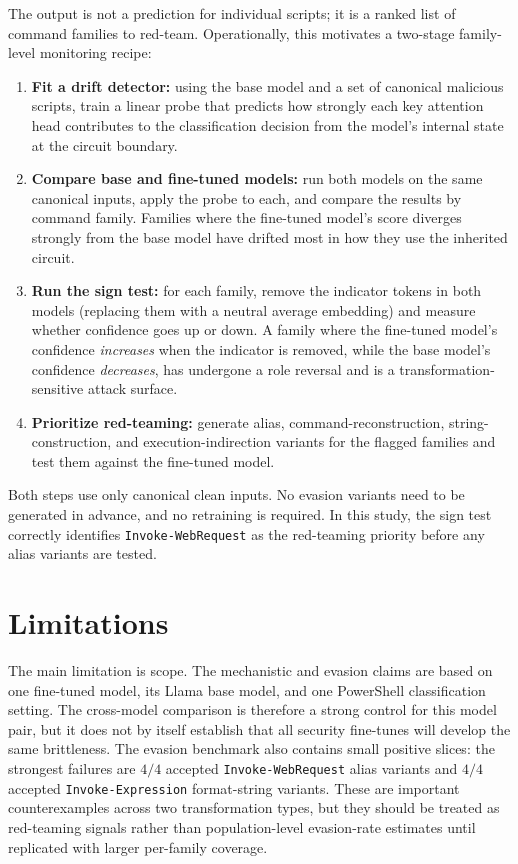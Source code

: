 \documentclass{article}
\begin{document}
The output is not a prediction for individual scripts; it is a ranked list of command families to red-team. Operationally, this motivates a two-stage family-level monitoring recipe:
\begin{enumerate}[leftmargin=1.5em,itemsep=0.2em,topsep=0.2em,parsep=0pt]
  \item \textbf{Fit a drift detector:} using the base model and a set of canonical malicious scripts, train a linear probe that predicts how strongly each key attention head contributes to the classification decision from the model's internal state at the circuit boundary.
  \item \textbf{Compare base and fine-tuned models:} run both models on the same canonical inputs, apply the probe to each, and compare the results by command family. Families where the fine-tuned model's score diverges strongly from the base model have drifted most in how they use the inherited circuit.
  \item \textbf{Run the sign test:} for each family, remove the indicator tokens in both models (replacing them with a neutral average embedding) and measure whether confidence goes up or down. A family where the fine-tuned model's confidence \emph{increases} when the indicator is removed, while the base model's confidence \emph{decreases}, has undergone a role reversal and is a transformation-sensitive attack surface.
  \item \textbf{Prioritize red-teaming:} generate alias, command-reconstruction, string-construction, and execution-indirection variants for the flagged families and test them against the fine-tuned model.
\end{enumerate}

Both steps use only canonical clean inputs. No evasion variants need to be generated in advance, and no retraining is required. In this study, the sign test correctly identifies \texttt{Invoke-WebRequest} as the red-teaming priority before any alias variants are tested.

\section{Limitations}
The main limitation is scope. The mechanistic and evasion claims are based on one fine-tuned model, its Llama base model, and one PowerShell classification setting. The cross-model comparison is therefore a strong control for this model pair, but it does not by itself establish that all security fine-tunes will develop the same brittleness. The evasion benchmark also contains small positive slices: the strongest failures are \(4/4\) accepted \texttt{Invoke-WebRequest} alias variants and \(4/4\) accepted \texttt{Invoke-Expression} format-string variants. These are important counterexamples across two transformation types, but they should be treated as red-teaming signals rather than population-level evasion-rate estimates until replicated with larger per-family coverage.
\end{document}
